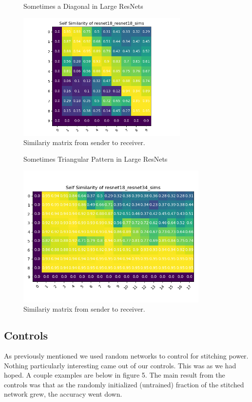 \documentclass{article} %
\begin{document}
\begin{center}
   \begin{figure}[h!]
      \centering
      \caption{Sometimes a Diagonal in Large ResNets}
      \includegraphics[width=8.5cm]{resnet18_resnet18_sims.png}
      \caption*{Similariy matrix from sender to receiver.}
   \end{figure}
\end{center}

\begin{center}
   \begin{figure}[h!]
      \centering
      \caption{Sometimes Triangular Pattern in Large ResNets}
      \includegraphics[width=9.5cm]{resnet18_resnet34_sims.png}
      \caption*{Similariy matrix from sender to receiver.}
   \end{figure}
\end{center}

\subsection*{Controls}
As previously mentioned we used random networks to control for stitching power. Nothing particularly interesting
came out of our controls. This was as we had hoped. A couple examples are below in figure 5. The main result from the controls
was that as the randomly initialized (untrained) fraction of the stitched network grew, the accuracy went down.
\end{document}
